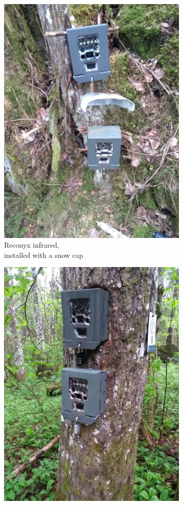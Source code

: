 \begin{figure}
\begin{subfigure}{.5\textwidth}
		  \centering
		  	\includegraphics[width=.8\linewidth]{./img/cam_install_example/IMG_20190515_170952923.jpg}
		  \caption{Reconyx infrared,\\ installed with a snow cap}
		  	\label{fig:cam_ex_b}
	\end{subfigure}
		\begin{subfigure}{.5\textwidth}
		  \centering
		  	\includegraphics[width=.8\linewidth]{./img/cam_install_example/IMG_20190521_181329313.jpg}

\end{subfigure}
\end{figure}
